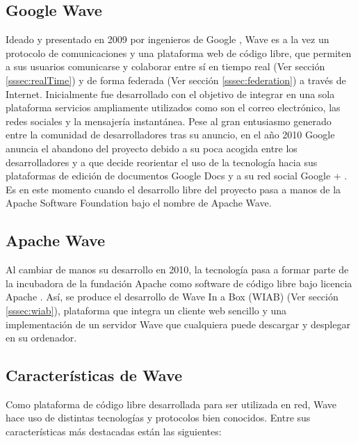   \subsection{Google Wave}\label{ssec:wave}

  Ideado y presentado en 2009 por ingenieros de Google \cite{ref:wave_announcement}, Wave es a la vez un protocolo de comunicaciones \cite{ref:wave_over_xmpp} y una plataforma web de código libre, que permiten a sus usuarios comunicarse y colaborar entre sí en tiempo real (Ver sección \ref{sssec:realTime}) y de forma federada (Ver sección \ref{sssec:federation}) a través de Internet. 
  Inicialmente fue desarrollado con el objetivo de integrar en una sola plataforma servicios ampliamente utilizados como son el correo electrónico, las redes sociales y la mensajería instantánea. Pese al gran entusiasmo generado entre la comunidad de desarrolladores tras su anuncio, en el año 2010 Google anuncia el abandono del proyecto \cite{ref:google_wave_end} debido a su poca acogida entre los desarrolladores y a que decide reorientar el uso de la tecnología hacia sus plataformas de edición de documentos Google Docs \cite{ref:google_docs} y a su red social Google + \cite{ref:google_plus}.  Es en este momento cuando el desarrollo libre del proyecto pasa a manos de la Apache Software Foundation bajo el nombre de Apache Wave.

  \subsection{Apache Wave}
  
  Al cambiar de manos su desarrollo en 2010, la tecnología pasa a formar parte de la incubadora de la fundación Apache \cite{ref:apache_wave_about} como software de código libre bajo licencia Apache \cite{ref:apache_license}. Así, se produce el desarrollo de Wave In a Box (WIAB) (Ver sección \ref{sssec:wiab}), plataforma que integra un cliente web sencillo y una implementación de un servidor Wave que cualquiera puede descargar y desplegar en su ordenador.
  
  \subsection{Características de Wave}
  
  Como plataforma de código libre desarrollada para ser utilizada en red, Wave hace uso de distintas tecnologías y protocolos bien conocidos. Entre sus características más destacadas están las siguientes:

